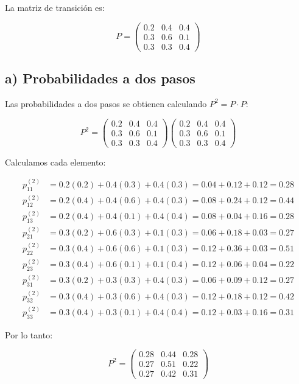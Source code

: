 \documentclass{article}
\begin{document}
La matriz de transición es:

\[
P = \begin{pmatrix} 
0.2 & 0.4 & 0.4 \\ 
0.3 & 0.6 & 0.1 \\ 
0.3 & 0.3 & 0.4 
\end{pmatrix}
\]

\subsection*{a) Probabilidades a dos pasos}

Las probabilidades a dos pasos se obtienen calculando \(P^2 = P \cdot P\):

\[
P^2 = \begin{pmatrix} 
0.2 & 0.4 & 0.4 \\ 
0.3 & 0.6 & 0.1 \\ 
0.3 & 0.3 & 0.4 
\end{pmatrix}
\begin{pmatrix} 
0.2 & 0.4 & 0.4 \\ 
0.3 & 0.6 & 0.1 \\ 
0.3 & 0.3 & 0.4 
\end{pmatrix}
\]

Calculamos cada elemento:

\[
\begin{aligned}
p_{11}^{(2)} &= 0.2(0.2) + 0.4(0.3) + 0.4(0.3) = 0.04 + 0.12 + 0.12 = 0.28 \\
p_{12}^{(2)} &= 0.2(0.4) + 0.4(0.6) + 0.4(0.3) = 0.08 + 0.24 + 0.12 = 0.44 \\
p_{13}^{(2)} &= 0.2(0.4) + 0.4(0.1) + 0.4(0.4) = 0.08 + 0.04 + 0.16 = 0.28 \\
p_{21}^{(2)} &= 0.3(0.2) + 0.6(0.3) + 0.1(0.3) = 0.06 + 0.18 + 0.03 = 0.27 \\
p_{22}^{(2)} &= 0.3(0.4) + 0.6(0.6) + 0.1(0.3) = 0.12 + 0.36 + 0.03 = 0.51 \\
p_{23}^{(2)} &= 0.3(0.4) + 0.6(0.1) + 0.1(0.4) = 0.12 + 0.06 + 0.04 = 0.22 \\
p_{31}^{(2)} &= 0.3(0.2) + 0.3(0.3) + 0.4(0.3) = 0.06 + 0.09 + 0.12 = 0.27 \\
p_{32}^{(2)} &= 0.3(0.4) + 0.3(0.6) + 0.4(0.3) = 0.12 + 0.18 + 0.12 = 0.42 \\
p_{33}^{(2)} &= 0.3(0.4) + 0.3(0.1) + 0.4(0.4) = 0.12 + 0.03 + 0.16 = 0.31
\end{aligned}
\]

Por lo tanto:

\[
P^2 = \begin{pmatrix} 
0.28 & 0.44 & 0.28 \\ 
0.27 & 0.51 & 0.22 \\ 
0.27 & 0.42 & 0.31 
\end{pmatrix}
\]
\end{document}
